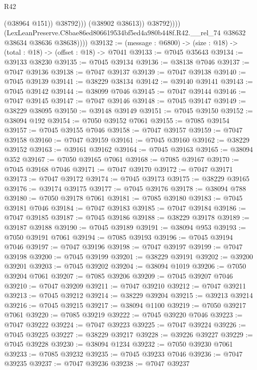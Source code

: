 \begin{lexlean}{R42}
\begin{coremodule}
{                            (@38964 @151))
                          @38792)))
                    (@38902 @38613))
                  @38792))))
          (LexLeanPreserve.C8bae86ed806619534bf5ed4a980b448f.R42.__rel_74
            @38632
            @38634
            @38636
            @38638))))
@39132 := (message : @6800) -> (size : @18) -> (total : @18) -> (offset : @18) -> @7041
@39133 := @7045 @35643
@39134 := @39133 @38230
@39135 := @7045 @39134
@39136 := @38138 @7046
@39137 := @7047 @39136
@39138 := @7047 @39137
@39139 := @7047 @39138
@39140 := @7045 @39139
@39141 := @38229 @38134
@39142 := @39140 @39141
@39143 := @7045 @39142
@39144 := @38099 @7046
@39145 := @7047 @39144
@39146 := @7047 @39145
@39147 := @7047 @39146
@39148 := @7045 @39147
@39149 := @38229 @38095
@39150 := @39148 @39149
@39151 := @7045 @39150
@39152 := @38094 @192
@39154 := @7050 @39152 @7061
@39155 := @7085 @39154
@39157 := @7045 @39155 @7046
@39158 := @7047 @39157
@39159 := @7047 @39158
@39160 := @7047 @39159
@39161 := @7045 @39160
@39162 := @38229 @39152
@39163 := @39161 @39162
@39164 := @7045 @39163
@39165 := @38094 @352
@39167 := @7050 @39165 @7061
@39168 := @7085 @39167
@39170 := @7045 @39168 @7046
@39171 := @7047 @39170
@39172 := @7047 @39171
@39173 := @7047 @39172
@39174 := @7045 @39173
@39175 := @38229 @39165
@39176 := @39174 @39175
@39177 := @7045 @39176
@39178 := @38094 @788
@39180 := @7050 @39178 @7061
@39181 := @7085 @39180
@39183 := @7045 @39181 @7046
@39184 := @7047 @39183
@39185 := @7047 @39184
@39186 := @7047 @39185
@39187 := @7045 @39186
@39188 := @38229 @39178
@39189 := @39187 @39188
@39190 := @7045 @39189
@39191 := @38094 @953
@39193 := @7050 @39191 @7061
@39194 := @7085 @39193
@39196 := @7045 @39194 @7046
@39197 := @7047 @39196
@39198 := @7047 @39197
@39199 := @7047 @39198
@39200 := @7045 @39199
@39201 := @38229 @39191
@39202 := @39200 @39201
@39203 := @7045 @39202
@39204 := @38094 @1019
@39206 := @7050 @39204 @7061
@39207 := @7085 @39206
@39209 := @7045 @39207 @7046
@39210 := @7047 @39209
@39211 := @7047 @39210
@39212 := @7047 @39211
@39213 := @7045 @39212
@39214 := @38229 @39204
@39215 := @39213 @39214
@39216 := @7045 @39215
@39217 := @38094 @1100
@39219 := @7050 @39217 @7061
@39220 := @7085 @39219
@39222 := @7045 @39220 @7046
@39223 := @7047 @39222
@39224 := @7047 @39223
@39225 := @7047 @39224
@39226 := @7045 @39225
@39227 := @38229 @39217
@39228 := @39226 @39227
@39229 := @7045 @39228
@39230 := @38094 @1234
@39232 := @7050 @39230 @7061
@39233 := @7085 @39232
@39235 := @7045 @39233 @7046
@39236 := @7047 @39235
@39237 := @7047 @39236
@39238 := @7047 @39237
}
\end{coremodule}
\end{lexlean}
